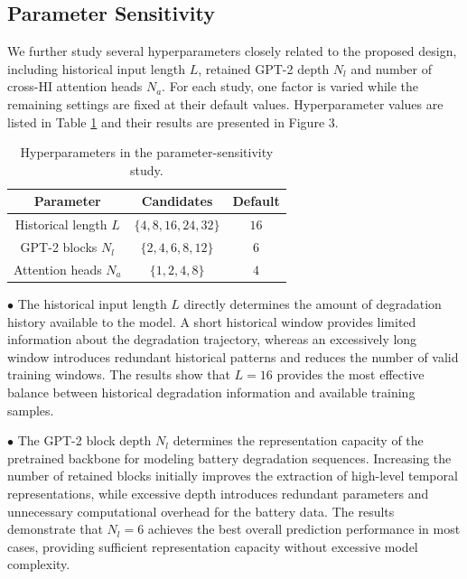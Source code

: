 \documentclass[preprint,12pt]{elsarticle}
\begin{document}
\subsection{Parameter Sensitivity}

We further study several hyperparameters closely related to the proposed design, including historical input length $L$, retained GPT-2 depth $N_l$ and number of cross-HI attention heads $N_a$. For each study, one factor is varied while the remaining settings are fixed at their default values. Hyperparameter values are listed in Table \ref{tab:parameter_search} and their results are presented in Figure 3.

\begin{table}[t]
\centering
\caption{Hyperparameters in the parameter-sensitivity study.}
\label{tab:parameter_search}
\setlength{\tabcolsep}{18pt}
\renewcommand{\arraystretch}{1.15}
\begin{tabular}{c|c|c}
\hline
\textbf{Parameter} & \textbf{Candidates} & \textbf{Default} \\
\hline
Historical length $L$ & $\{4,8,16,24,32\}$ & $16$ \\
GPT-2 blocks $N_l$ & $\{2,4,6,8,12\}$ & $6$ \\
Attention heads $N_a$ & $\{1,2,4,8\}$ & $4$ \\
\hline
\end{tabular}
\end{table}



$\bullet$ 
The historical input length $L$ directly determines the amount of degradation history available to the model. A short historical window provides limited information about the degradation trajectory, whereas an excessively long window introduces redundant historical patterns and reduces the number of valid training windows. The results show that $L=16$ provides the most effective balance between historical degradation information and available training samples.

$\bullet$ 
The GPT-2 block depth $N_l$ determines the representation capacity of the pretrained backbone for modeling battery degradation sequences. Increasing the number of retained blocks initially improves the extraction of high-level temporal representations, while excessive depth introduces redundant parameters and unnecessary computational overhead for the battery data. The results demonstrate that $N_l=6$ achieves the best overall prediction performance in most cases, providing sufficient representation capacity without excessive model complexity.
\end{document}
